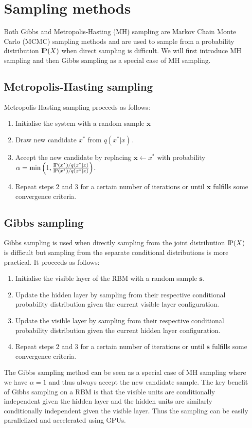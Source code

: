 \section{Sampling methods}
Both Gibbs and Metropolis-Hasting (MH) sampling are Markov Chain Monte Carlo (MCMC) sampling methods and are used to sample from a probability distribution $\text{I\kern-0.15em P}(X)$ when direct sampling is difficult. We will first introduce MH sampling and then Gibbs sampling as a special case of MH sampling.

\subsection*{Metropolis-Hasting sampling}
Metropolis-Hasting sampling \cite{metropolissampling} proceeds as follows:
\begin{enumerate}
    \item Initialise the system with a random sample $\mathbf{x}$
    \item Draw new candidate $x^*$ from $q(x^*|x)$.
    \item Accept the new candidate by replacing $\mathbf{x} \leftarrow x^*$ with probability $\alpha = \min \left(1, \frac{\text{I\kern-0.15em P}(x^*)/q(x^*|x)}{\text{I\kern-0.15em P}(x^*)/q(x^*|x)}\right)$.
    \item Repeat steps 2 and 3 for a certain number of iterations or until $\mathbf{x}$ fulfills some convergence criteria.
\end{enumerate}

\subsection*{Gibbs sampling}
Gibbs sampling \cite{gibbssampling} is used when directly sampling from the joint distribution $\text{I\kern-0.15em P}(X)$ is difficult but sampling from the separate conditional distributions is more practical. It proceeds as follows:

\begin{enumerate}
    \item Initialise the visible layer of the RBM with a random sample $\mathbf{s}$.
    \item Update the hidden layer by sampling from their respective conditional probability distribution given the current visible layer configuration.
    \item Update the visible layer by sampling from their respective conditional probability distribution given the current hidden layer configuration.
    \item Repeat steps 2 and 3 for a certain number of iterations or until $\mathbf{s}$ fulfills some convergence criteria.
\end{enumerate}

The Gibbs sampling method can be seen as a special case of MH sampling where we have $\alpha = 1$ and thus always accept the new candidate sample. The key benefit of Gibbs sampling on a RBM is that the visible units are conditionally independent given the hidden layer and the hidden units are similarly conditionally independent given the visible layer. Thus the sampling can be easily parallelized and accelerated using GPUs.